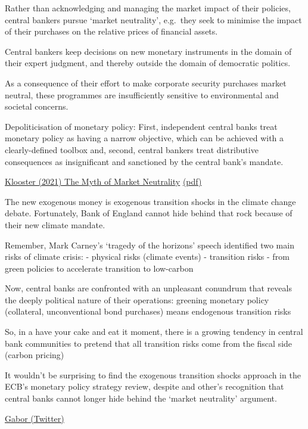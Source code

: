 \documentclass[
]{book}
\begin{document}
Rather than acknowledging and
managing the market impact of their policies, central bankers pursue `market neutrality', e.g.~they
seek to minimise the impact of their purchases on the relative prices of financial assets.

Central bankers keep decisions on new monetary instruments in the domain of their
expert judgment, and thereby outside the domain of democratic politics.

As a consequence of their effort to make corporate security purchases market neutral,
these programmes are insufficiently sensitive to environmental and societal concerns.

Depoliticisation of monetary policy: First, independent
central banks treat monetary policy as having a narrow objective, which can be achieved with a
clearly-defined toolbox and, second, central bankers treat distributive consequences as insignificant
and sanctioned by the central bank's mandate.

\href{https://www.tandfonline.com/doi/epub/10.1080/13563467.2019.1657077?needAccess=true}{Klooster (2021) The Myth of Market Neutrality}
\href{pdf/Klooster_2021_Myth_of_Market_Neutrality.pdf}{(pdf)}

The new exogenous money is exogenous transition shocks in the climate change debate.
Fortunately, Bank of England cannot hide behind that rock because of their new climate mandate.

Remember, Mark Carney's `tragedy of the horizons' speech identified two main risks of climate crisis:
- physical risks (climate events)
- transition risks - from green policies to accelerate transition to low-carbon

Now, central banks are confronted with an unpleasant conundrum that reveals the deeply political nature of their operations:
greening monetary policy (collateral, unconventional bond purchases) means endogenous transition risks

So, in a have your cake and eat it moment, there is a growing tendency in central bank communities to pretend that all transition risks come from the fiscal side (carbon pricing)

It wouldn't be surprising to find the exogenous transition shocks approach in the ECB's monetary policy strategy review, despite \citet{Lagarde}
and other's recognition that central banks cannot longer hide behind the `market neutrality' argument.

\href{https://twitter.com/DanielaGabor/status/1384837864412917765}{Gabor (Twitter)}
\end{document}
